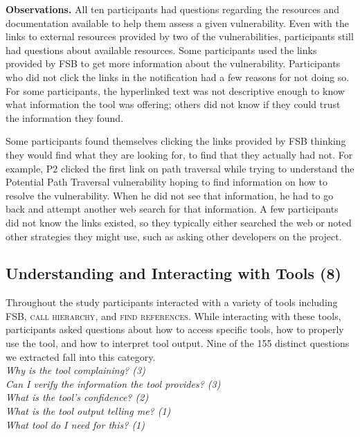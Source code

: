 \documentclass[conference]{IEEEtran}
\begin{document}
\noindent\textbf{Observations.}
All ten participants had questions regarding the resources and documentation available to help them assess a given vulnerability. 
Even with the links to external resources provided by two of the vulnerabilities, participants still had questions about available resources. 
Some participants used the links provided by FSB to get more information about the vulnerability.
Participants who did not click the links in the notification had a few reasons for not doing so.
For some participants, the hyperlinked text was not descriptive enough to know what information the tool was offering; others did not know if they could trust the information they found.

Some participants found themselves clicking the links provided by FSB thinking they would find what they are looking for, to find that they actually had not. 
For example, P2 clicked the first link on path traversal while trying to understand the Potential Path Traversal vulnerability hoping to find information on how to resolve the vulnerability.
When he did not see that information, he had to go back and attempt another web search for that information. 
A few participants did not know the links existed, so they typically either searched the web or noted other strategies they might use, such as asking other developers on the project.
\\



\noindent\subsection{\textbf{Understanding and Interacting with Tools (8)}}\label{uit}

Throughout the study participants interacted with a variety of tools including FSB, \textsc{call hierarchy}, and \textsc{find references}. 
While interacting with these tools, participants asked questions about how to access specific tools, how to properly use the tool, and how to interpret tool output. 
Nine of the 155 distinct questions we extracted fall into this category.
\\

\noindent\emph{Why is the tool complaining? (3)} \\
\emph{Can I verify the information the tool provides? (3)} \\
\emph{What is the tool's confidence? (2)} \\
\emph{What is the tool output telling me? (1)} \\
\emph{What tool do I need for this? (1)} \\
\end{document}
